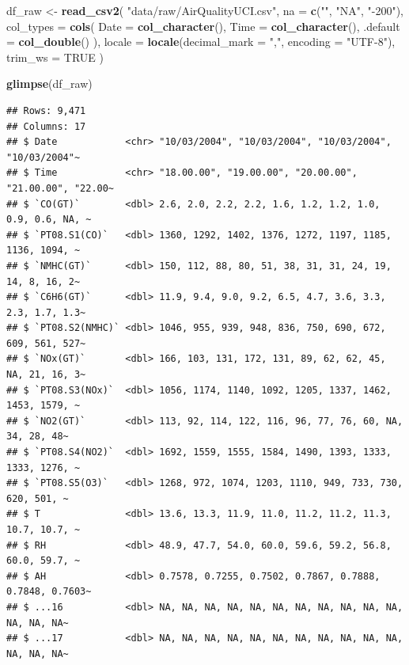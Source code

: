 \documentclass[
]{article}
\newenvironment{Shaded}{\begin{snugshade}}{\end{snugshade}}
\newcommand{\AttributeTok}[1]{\textcolor[rgb]{0.13,0.29,0.53}{#1}}
\newcommand{\ConstantTok}[1]{\textcolor[rgb]{0.56,0.35,0.01}{#1}}
\newcommand{\FunctionTok}[1]{\textcolor[rgb]{0.13,0.29,0.53}{\textbf{#1}}}
\newcommand{\NormalTok}[1]{#1}
\newcommand{\OtherTok}[1]{\textcolor[rgb]{0.56,0.35,0.01}{#1}}
\newcommand{\StringTok}[1]{\textcolor[rgb]{0.31,0.60,0.02}{#1}}
\begin{document}
\begin{Shaded}
\begin{Highlighting}[]
\NormalTok{df\_raw }\OtherTok{\textless{}{-}} \FunctionTok{read\_csv2}\NormalTok{(}
  \StringTok{"data/raw/AirQualityUCI.csv"}\NormalTok{,}
  \AttributeTok{na =} \FunctionTok{c}\NormalTok{(}\StringTok{""}\NormalTok{, }\StringTok{"NA"}\NormalTok{, }\StringTok{"{-}200"}\NormalTok{),}
  \AttributeTok{col\_types =} \FunctionTok{cols}\NormalTok{(}
    \AttributeTok{Date =} \FunctionTok{col\_character}\NormalTok{(),}
    \AttributeTok{Time =} \FunctionTok{col\_character}\NormalTok{(),}
    \AttributeTok{.default =} \FunctionTok{col\_double}\NormalTok{()}
\NormalTok{  ),}
  \AttributeTok{locale =} \FunctionTok{locale}\NormalTok{(}\AttributeTok{decimal\_mark =} \StringTok{","}\NormalTok{, }\AttributeTok{encoding =} \StringTok{"UTF{-}8"}\NormalTok{),}
  \AttributeTok{trim\_ws =} \ConstantTok{TRUE}
\NormalTok{)}

\FunctionTok{glimpse}\NormalTok{(df\_raw)}
\end{Highlighting}
\end{Shaded}

\begin{verbatim}
## Rows: 9,471
## Columns: 17
## $ Date            <chr> "10/03/2004", "10/03/2004", "10/03/2004", "10/03/2004"~
## $ Time            <chr> "18.00.00", "19.00.00", "20.00.00", "21.00.00", "22.00~
## $ `CO(GT)`        <dbl> 2.6, 2.0, 2.2, 2.2, 1.6, 1.2, 1.2, 1.0, 0.9, 0.6, NA, ~
## $ `PT08.S1(CO)`   <dbl> 1360, 1292, 1402, 1376, 1272, 1197, 1185, 1136, 1094, ~
## $ `NMHC(GT)`      <dbl> 150, 112, 88, 80, 51, 38, 31, 31, 24, 19, 14, 8, 16, 2~
## $ `C6H6(GT)`      <dbl> 11.9, 9.4, 9.0, 9.2, 6.5, 4.7, 3.6, 3.3, 2.3, 1.7, 1.3~
## $ `PT08.S2(NMHC)` <dbl> 1046, 955, 939, 948, 836, 750, 690, 672, 609, 561, 527~
## $ `NOx(GT)`       <dbl> 166, 103, 131, 172, 131, 89, 62, 62, 45, NA, 21, 16, 3~
## $ `PT08.S3(NOx)`  <dbl> 1056, 1174, 1140, 1092, 1205, 1337, 1462, 1453, 1579, ~
## $ `NO2(GT)`       <dbl> 113, 92, 114, 122, 116, 96, 77, 76, 60, NA, 34, 28, 48~
## $ `PT08.S4(NO2)`  <dbl> 1692, 1559, 1555, 1584, 1490, 1393, 1333, 1333, 1276, ~
## $ `PT08.S5(O3)`   <dbl> 1268, 972, 1074, 1203, 1110, 949, 733, 730, 620, 501, ~
## $ T               <dbl> 13.6, 13.3, 11.9, 11.0, 11.2, 11.2, 11.3, 10.7, 10.7, ~
## $ RH              <dbl> 48.9, 47.7, 54.0, 60.0, 59.6, 59.2, 56.8, 60.0, 59.7, ~
## $ AH              <dbl> 0.7578, 0.7255, 0.7502, 0.7867, 0.7888, 0.7848, 0.7603~
## $ ...16           <dbl> NA, NA, NA, NA, NA, NA, NA, NA, NA, NA, NA, NA, NA, NA~
## $ ...17           <dbl> NA, NA, NA, NA, NA, NA, NA, NA, NA, NA, NA, NA, NA, NA~
\end{verbatim}
\end{document}
